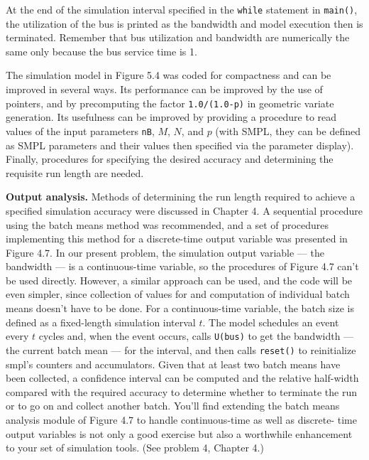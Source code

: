 At the end of the simulation interval specified in the \texttt{while} statement
in \texttt{main()}, the utilization of the bus is printed as the bandwidth and model
execution then is terminated. Remember that bus utilization and bandwidth
are numerically the same only because the bus service time is 1.

The simulation model in Figure 5.4 was coded for compactness and can be
improved in several ways. Its performance can be improved by the use of
pointers, and by precomputing the factor \texttt{1.0/(1.0-p)} in geometric variate
generation. Its usefulness can be improved by providing a procedure to read
values of the input parameters \texttt{nB}, $M$, $N$, and $p$ (with SMPL, they can be
defined as SMPL parameters and their values then specified via the parameter
display). Finally, procedures for specifying the desired accuracy and
determining the requisite run length are needed.

\noindent\textbf{Output analysis.} Methods of determining the run length required to
achieve a specified simulation accuracy were discussed in Chapter 4. A
sequential procedure using the batch means method was recommended, and a
set of procedures implementing this method for a discrete-time output
variable was presented in Figure 4.7. In our present problem, the simulation
output variable --- the bandwidth --- is a continuous-time variable, so the
procedures of Figure 4.7 can't be used directly. However, a similar approach
can be used, and the code will be even simpler, since collection of values for
and computation of individual batch means doesn't have to be done. For a
continuous-time variable, the batch size is defined as a fixed-length simulation
interval $t$. The model schedules an event every $t$ cycles and, when the
event occurs, calls \texttt{U(bus)} to get the bandwidth --- the current batch mean ---
for the interval, and then calls \texttt{reset()} to reinitialize smpl's counters and
accumulators. Given that at least two batch means have been collected, a
confidence interval can be computed and the relative half-width compared
with the required accuracy to determine whether to terminate the run or to
go on and collect another batch. You'll find extending the batch means
analysis module of Figure 4.7 to handle continuous-time as well as discrete-
time output variables is not only a good exercise but also a worthwhile
enhancement to your set of simulation tools. (See problem 4, Chapter 4.)


